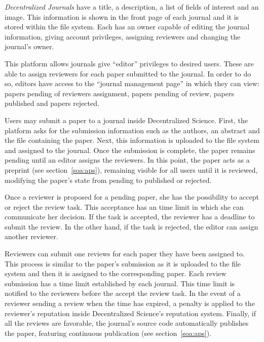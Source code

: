 \emph{Decentralized Journals} have a title, a description, a list of fields of
interest and an image. This information is shown in the front page of each
journal and it is stored within the file system. Each 
has an owner capable of editing the journal information, giving account
privileges, assigning reviewers and changing the journal's owner.

\label{cha:platform-description-5}

This platform allows journals give ``editor'' privileges to desired users. These
are able to assign reviewers for each paper submitted to the journal. In order
to do so, editors have access to the ``journal management page'' in which they
can view: papers pending of reviewers assignment, papers pending of review,
papers published and papers rejected.

\label{cha:platform-description-4}

Users may submit a paper to a journal inside Decentralized Science. First, the
platform asks for the submission information such as the authors, an abstract
and the file containing the paper. Next, this information is uploaded to the
file system and assigned to the journal. Once the submission is complete, the
paper remains pending until an editor assigns the reviewers. In this point, the
paper acts as a preprint (see section~\ref{soa:aps}), remaining visible for all
users until it is reviewed, modifying the paper's state from pending to
published or rejected.

\label{cha:platform-description-3}

Once a reviewer is proposed for a pending paper, she has the possibility to
accept or reject the review task. This acceptance has an time limit in which she
can communicate her decision. If the task is accepted, the reviewer has a
deadline to submit the review. In the other hand, if the task is rejected, the
editor can assign another reviewer.

\label{cha:platform-description-2}

Reviewers can submit one reviews for each paper they have been assigned to. This
process is similar to the paper's submission as it is uploaded to the file
system and then it is assigned to the corresponding paper. Each review
submission has a time limit established by each journal. This time limit is
notified to the reviewers before the accept the review task. In the event of a
reviewer sending a review when the time has expired, a penalty is applied to the
reviewer's reputation inside Decentralized Science's reputation system. Finally,
if all the reviews are favorable, the journal's source code automatically
publishes the paper, featuring continuous publication (see
section~\ref{soa:aps}).

